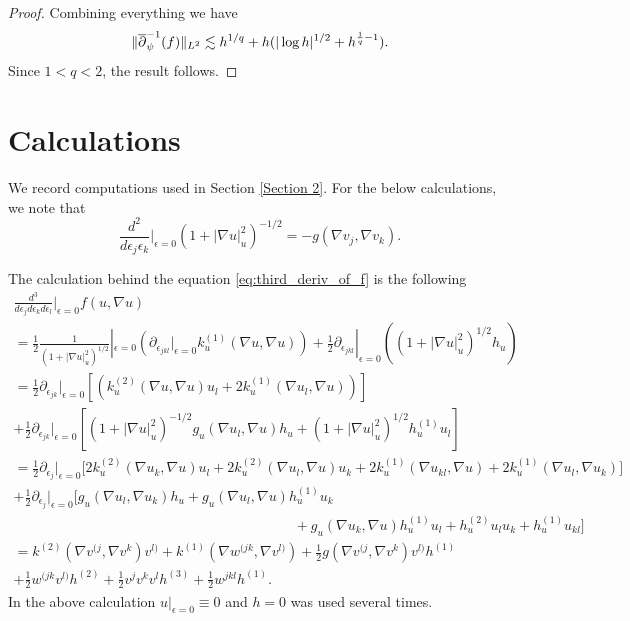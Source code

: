 \documentclass[12pt]{amsart}
\def\p{\partial}
\DeclarePairedDelimiter\norm{\lVert}{\rVert}
\theoremstyle{definition}
\theoremstyle{remark}
\newcommand{\abs}[1]{\lvert #1 \rvert}
\newcommand{\eps}{\epsilon}
\newcommand{\op}{\overline \p}
\begin{document}
\begin{proof}
Combining everything we have
\[
 \norm{\op_\psi^{-1}(f)}_{L^2}\lesssim h^{1/q}+h(|\log h|^{1/2}+h^{\frac{1}{q}-1}).
\]
Since $1<q<2$, the result follows.
\end{proof}

\section{Calculations}\label{appx:calculations}
We record computations used in Section \ref{Section 2}. For the below calculations, we note that
\[
 \frac{d^2}{d\eps_j\eps_k}\Big|_{\eps=0}(1+\abs{\nabla u}^2_u)^{-1/2}=-g(\nabla v_j,\nabla v_k).
\]

The calculation behind the equation \eqref{eq:third_deriv_of_f} is the following
\begin{multline*}%
 \frac{d^3}{d\eps_{j}d\eps_kd\eps_l}\Big|_{\eps=0}f(u,\nabla u) \\
 =\frac{1}{2}\frac{1}{(1+\abs{\nabla u}^2_{u})^{1/2}}|_{\eps=0}\left(\p_{\eps_{jkl}}|_{\eps=0}k_u^{(1)}(\nabla u,\nabla u)\right)+\frac{1}{2}\p_{\eps_{jkl}}|_{\eps=0}\left((1+\abs{\nabla u}^2_{u})^{1/2}h_u\right) \\
 =\frac{1}{2}\p_{\eps_{jk}}|_{\eps=0}\left[\left(k_u^{(2)}(\nabla u,\nabla u)u_l+2k_u^{(1)}(\nabla u_l,\nabla u)\right)\right] \\
 +\frac{1}{2}\p_{\eps_{jk}}|_{\eps=0}\left[(1+\abs{\nabla u}^2_{u})^{-1/2}g_u(\nabla u_l,\nabla u)h_u+(1+\abs{\nabla u}^2_{u})^{1/2}h_u^{(1)}u_l \right] \\
 =\frac{1}{2}\p_{\eps_{j}}|_{\eps=0}\Big[2k_u^{(2)}(\nabla u_k,\nabla u)u_l+2k_u^{(2)}(\nabla u_l,\nabla u)u_k+2k_u^{(1)}(\nabla u_{kl},\nabla u)+2k_u^{(1)}(\nabla u_{l},\nabla u_k)\Big] \\
 +\frac{1}{2}\p_{\eps_{j}}|_{\eps=0}\Big[g_u(\nabla u_l,\nabla u_k)h_u+g_u(\nabla u_l,\nabla u)h_u^{(1)}u_k \\ 
 \qquad\qquad\qquad\qquad\qquad\qquad\qquad\qquad\qquad\qquad +g_u(\nabla u_k,\nabla u)h_u^{(1)}u_l+h_u^{(2)}u_lu_k+h_u^{(1)}u_{kl} \Big] \\
 =k^{(2)}(\nabla v^{(j},\nabla v^k)v^{l)}+k^{(1)}(\nabla w^{(jk},\nabla v^{l)})+\frac{1}{2}g(\nabla v^{(j},\nabla v^k)v^{l)}h^{(1)} \\
 +\frac{1}{2}w^{(jk}v^{l)}h^{(2)}+\frac{1}{2}v^{j}v^{k}v^{l}h^{(3)}+\frac{1}{2}w^{jkl}h^{(1)}.
\end{multline*}
In the above calculation $u|_{\eps=0}\equiv 0$ and $h=0$ was used several times.
\end{document}
